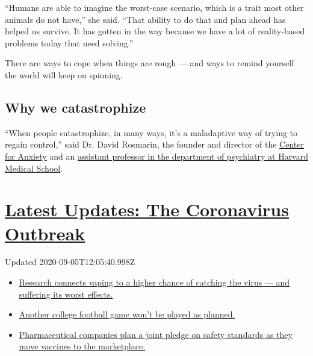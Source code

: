 ``Humans are able to imagine the worst-case scenario, which is a trait
most other animals do not have,'' she said. ``That ability to do that
and plan ahead has helped us survive. It has gotten in the way because
we have a lot of reality-based problems today that need solving.''

There are ways to cope when things are rough --- and ways to remind
yourself the world will keep on spinning.

\hypertarget{why-we-catastrophize}{%
\subsection{Why we catastrophize}\label{why-we-catastrophize}}

``When people catastrophize, in many ways, it's a maladaptive way of
trying to regain control,'' said Dr. David Rosmarin, the founder and
director of the \href{http://www.centerforanxiety.org/}{Center for
Anxiety} and an
\href{http://www.mcleanhospital.org/biography/david-h-rosmarin}{assistant
professor in the department of psychiatry at Harvard Medical School}.

\hypertarget{latest-updates-the-coronavirus-outbreak}{%
\section{\texorpdfstring{\href{https://www.nytimes3xbfgragh.onion/2020/09/04/world/covid-19-coronavirus.html?action=click\&pgtype=Article\&state=default\&region=MAIN_CONTENT_1\&context=storylines_live_updates}{Latest
Updates: The Coronavirus
Outbreak}}{Latest Updates: The Coronavirus Outbreak}}\label{latest-updates-the-coronavirus-outbreak}}

Updated 2020-09-05T12:05:40.998Z

\begin{itemize}
\tightlist
\item
  \href{https://www.nytimes3xbfgragh.onion/2020/09/04/world/covid-19-coronavirus.html?action=click\&pgtype=Article\&state=default\&region=MAIN_CONTENT_1\&context=storylines_live_updates\#link-1654f6ad}{Research
  connects vaping to a higher chance of catching the virus --- and
  suffering its worst effects.}
\item
  \href{https://www.nytimes3xbfgragh.onion/2020/09/04/world/covid-19-coronavirus.html?action=click\&pgtype=Article\&state=default\&region=MAIN_CONTENT_1\&context=storylines_live_updates\#link-52e4198a}{Another
  college football game won't be played as planned.}
\item
  \href{https://www.nytimes3xbfgragh.onion/2020/09/04/world/covid-19-coronavirus.html?action=click\&pgtype=Article\&state=default\&region=MAIN_CONTENT_1\&context=storylines_live_updates\#link-181cef0}{Pharmaceutical
  companies plan a joint pledge on safety standards as they move
  vaccines to the marketplace.}
\end{itemize}

